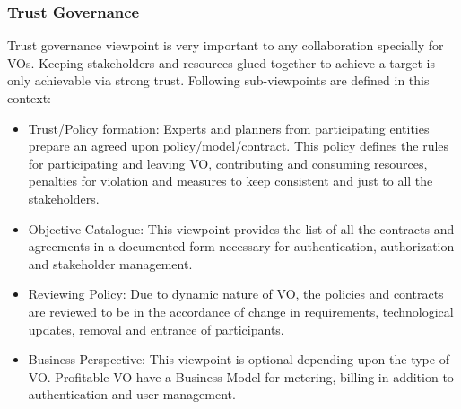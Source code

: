 \documentclass[]{article}
\begin{document}
\subsubsection{Trust Governance} Trust governance viewpoint is very important to any collaboration specially for VOs. Keeping stakeholders and resources glued together to achieve a target is only achievable via strong trust. Following sub-viewpoints are defined in this context:
\begin{itemize}
\item Trust/Policy formation:  Experts and planners from participating entities prepare an agreed upon policy/model/contract. This policy defines the rules for participating and leaving VO, contributing and  consuming resources, penalties for violation and measures to keep consistent and just to all the stakeholders.
\item Objective Catalogue: This viewpoint provides the list of all the contracts and agreements in a documented form necessary for authentication, authorization and stakeholder management.
\item Reviewing Policy: Due to dynamic nature of VO, the policies and contracts are reviewed to be in the accordance of change in requirements, technological updates, removal and entrance of participants.
\item Business Perspective: This viewpoint is optional depending upon the type of VO. Profitable VO have a Business Model for metering, billing in addition to authentication and  user management.
\end{itemize}
\end{document}
